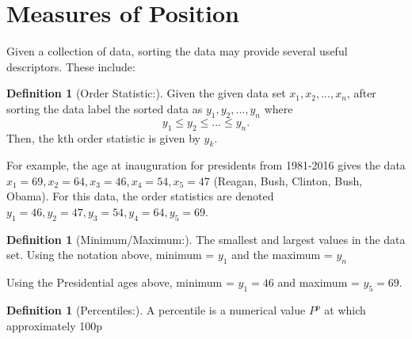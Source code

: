 \documentclass[10pt,]{book}
\theoremstyle{plain}
\theoremstyle{definition}
\newtheorem{definition}[theorem]{Definition}
\theoremstyle{definition}
\theoremstyle{definition}
\numberwithin{equation}{section}
\begin{document}
\section[Measures of Position]{Measures of Position}\label{section-6}
Given a collection of data, sorting the data may provide several useful descriptors. These include:
\begin{definition}[Order Statistic:]\label{definition-1}
Given the given data set \(x_1, x_2, ... , x_n\), after sorting the data label the sorted data as \(y_1, y_2, ..., y_n\) where  
	\begin{equation*} y_1 \le y_2 \le ... \le y_n.\end{equation*} 
	Then, the kth order statistic is given by \(y_k\). %
\end{definition}
\par

	For example, the age at inauguration for presidents from 1981-2016 gives the data \(x_1 = 69, x_2 = 64, x_3 = 46, x_4 = 54, x_5 = 47\) (Reagan, Bush, Clinton, Bush, Obama). For this data, the order statistics are denoted \(y_1 = 46, y_2 = 47, y_3 = 54, y_4 = 64, y_5 = 69\).
\begin{definition}[Minimum/Maximum:]\label{definition-2}
The smallest and largest values in the data set. Using the notation above, minimum = \(y_1\) and the maximum = \(y_n\)%
\end{definition}
\par

	Using the Presidential ages above, minimum = \(y_1 = 46\) and maximum = \(y_5 = 69\).
\begin{definition}[Percentiles:]\label{definition-3}
A percentile is a numerical value \(P^p\) at which approximately 100p%
\end{definition}
\par
\end{document}
